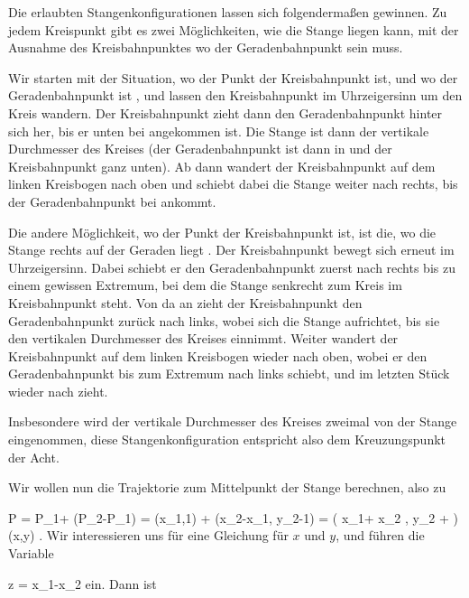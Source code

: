 {Die erlaubten Stangenkonfigurationen lassen sich folgendermaßen gewinnen. Zu jedem Kreispunkt gibt es zwei Möglichkeiten, wie die Stange liegen kann, mit der Ausnahme des Kreisbahnpunktes
 wo der Geradenbahnpunkt
 sein muss.

Wir starten mit der Situation, wo der Punkt
 der Kreisbahnpunkt ist, und wo
 der Geradenbahnpunkt ist
 {} {,}
und lassen den Kreisbahnpunkt im Uhrzeigersinn um den Kreis wandern. Der Kreisbahnpunkt zieht dann den Geradenbahnpunkt hinter sich her, bis er unten bei
 angekommen ist. Die Stange ist dann der vertikale Durchmesser des Kreises (der Geradenbahnpunkt ist dann in
 und der Kreisbahnpunkt ganz unten). Ab dann wandert der Kreisbahnpunkt auf dem linken Kreisbogen nach oben und schiebt dabei die Stange weiter nach rechts, bis der Geradenbahnpunkt bei
 ankommt.

Die andere Möglichkeit, wo der Punkt
 der Kreisbahnpunkt ist, ist die, wo die Stange rechts auf der Geraden liegt
 {} {.}
Der Kreisbahnpunkt bewegt sich erneut im Uhrzeigersinn. Dabei schiebt er den Geradenbahnpunkt zuerst nach rechts bis zu einem gewissen Extremum, bei dem die Stange senkrecht zum Kreis im Kreisbahnpunkt steht. Von da an zieht der Kreisbahnpunkt den Geradenbahnpunkt zurück nach links, wobei sich die Stange aufrichtet, bis sie den vertikalen Durchmesser des Kreises einnimmt. Weiter wandert der Kreisbahnpunkt auf dem linken Kreisbogen wieder nach oben, wobei er den Geradenbahnpunkt bis zum Extremum nach links schiebt, und im letzten Stück wieder nach
 zieht.

Insbesondere wird der vertikale Durchmesser des Kreises zweimal von der Stange eingenommen, diese Stangenkonfiguration entspricht also dem Kreuzungspunkt der Acht.

Wir wollen nun die Trajektorie zum Mittelpunkt der Stange berechnen, also zu

\mavergleichskettealign
{\vergleichskettealign
{ P
}
{ =} { P_1+  (P_2-P_1)
}
{ =} { (x_1,1) + (x_2-x_1, y_2-1)
}
{ =} { \left(  x_1+ x_2 , y_2 +  \right)
}
{ } {(x,y)
}
}
{}
{}{.}
Wir interessieren uns für eine Gleichung für $x$ und $y$, und führen die Variable

\mavergleichskette
{\vergleichskette
{ z
}
{ = }{ x_1-x_2
}
{  }{
}
{    }{
}
{   }{
}
}
{}{}{}
ein. Dann ist

}
